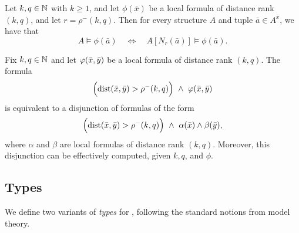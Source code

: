 \begin{lemma}\label{lem:ltp-local-subgraph}
    Let \(k,q \in \mathbb N\) with $k\ge 1$, and let
    \(\phi(\bar x)\) be a local \distFO formula of distance rank \((k,q)\), and let $r=\rho^-(k,q)$.
    Then  for every structure $A$ and tuple $\bar a\in A^{\bar x}$,
we have that
$$A\models \phi(\bar a) \quad\Longleftrightarrow\quad A[N_r(\bar a)]\models \phi(\bar a).$$
\end{lemma}

\begin{lemma}\label{lem:far-ltp}
    Fix $k,q\in\mathbb N$ and let $\varphi(\bar x,\bar y)$ be a local \distFO formula of distance rank $(k,q)$.
    The formula
    $$\Big(\mathrm{dist}(\bar x,\bar y)>\rho^-(k,q)\Big) \ \land\ \varphi(\bar x,\bar y)$$
    is equivalent to a disjunction of formulas of the form
    $$\Big(\dist(\tup x,\tup y)>\rho^-(k,q)\Big) \ \land\  \alpha(\tup x)\land \beta(\tup y),$$
    where $\alpha$ and $\beta$ are local \distFO formulas of distance rank $(k,q)$.
    Moreover, this disjunction can be effectively computed, given $k,q$, and $\phi$.
\end{lemma}

\subsection{Types}\label{sec:types}
We define two variants of \emph{types} for \distFO,
following the standard notions from model theory.

